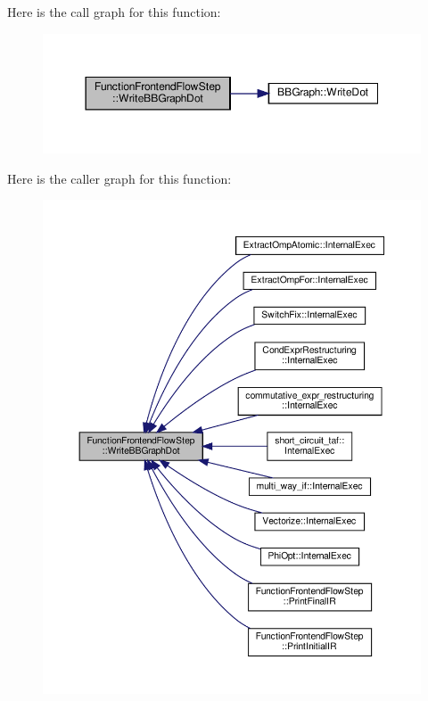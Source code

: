 Here is the call graph for this function\+:
\nopagebreak
\begin{figure}[H]
\begin{center}
\leavevmode
\includegraphics[width=350pt]{d8/d0a/classFunctionFrontendFlowStep_a4b3ca147e7b029e207a85b60fd0cb592_cgraph}
\end{center}
\end{figure}
Here is the caller graph for this function\+:
\nopagebreak
\begin{figure}[H]
\begin{center}
\leavevmode
\includegraphics[width=350pt]{d8/d0a/classFunctionFrontendFlowStep_a4b3ca147e7b029e207a85b60fd0cb592_icgraph}
\end{center}
\end{figure}


